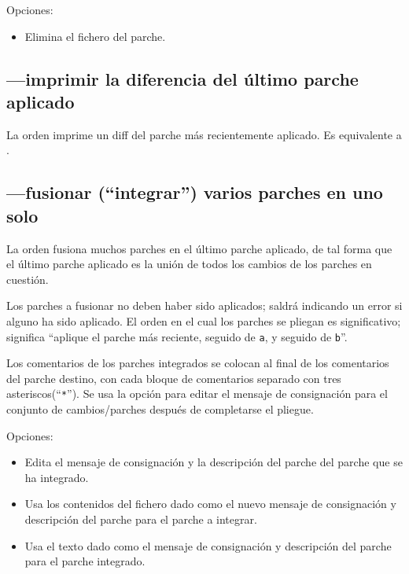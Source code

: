 Opciones:
\begin{itemize}
\item[\hgxopt{mq}{qdel}{-f}] Elimina el fichero del parche.
\end{itemize}

\subsection{---imprimir la diferencia del último
  parche aplicado}

La orden  imprime un diff del parche más
recientemente aplicado.  Es equivalente a .

\subsection{---fusionar (``integrar'') varios parches en
  uno solo}

La orden  fusiona muchos parches en el último parche
aplicado, de tal forma que el último parche aplicado es la unión de
todos los cambios de los parches en cuestión.

Los parches a fusionar no deben haber sido aplicados;
 saldrá indicando un error si alguno ha sido
aplicado.  El orden en el cual los parches se pliegan es
significativo;  significa ``aplique el parche
más reciente, seguido de \texttt{a}, y seguido de \texttt{b}''.

Los comentarios de los parches integrados se colocan al final de los
comentarios del parche destino, con cada bloque de comentarios
separado con tres asteriscos(``\texttt{*}'').  Se usa la opción
 para editar el mensaje de consignación para el
conjunto de cambios/parches después de completarse el pliegue.

Opciones:
\begin{itemize}
\item[\hgxopt{mq}{qfold}{-e}] Edita el mensaje de consignación y la
  descripción del parche del parche que se ha integrado.
\item[\hgxopt{mq}{qfold}{-l}] Usa los contenidos del fichero dado como
  el nuevo mensaje de consignación y descripción del parche para el
  parche a integrar.
\item[\hgxopt{mq}{qfold}{-m}] Usa el texto dado como el mensaje de
  consignación y descripción del parche para el parche integrado.
\end{itemize}

